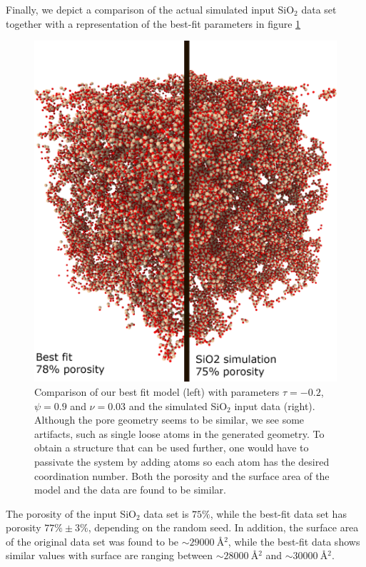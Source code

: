 \documentclass[aps,pre,twocolumn,letterpaper,floatfix,showpacs]{revtex4}
\begin{document}
Finally, we depict a comparison of the actual simulated input SiO$_2$ data set together with a
representation of the best-fit parameters in figure \ref{fig:porous_vs_model}   
\begin{figure}
\includegraphics[width=.45\textwidth]{comparison.png}
\caption{Comparison of our best fit model (left) with parameters $\tau=-0.2$, $\psi=0.9$ and $\nu=0.03$ and the simulated SiO$_2$ input data (right).
Although the pore geometry seems to be similar, we see some artifacts, such as single loose atoms in the generated geometry.
To obtain a structure that can be used further, one would have to passivate the system by adding atoms so each atom has the desired coordination number.
Both the porosity and the surface area of the model and the data are found to be similar.}
\label{fig:porous_vs_model}
\end{figure}

The porosity of the input SiO$_2$ data set is $75\%$, while the best-fit data set has
porosity $77\% \pm 3 \%$, depending on the random seed. In addition, the surface area
of the original data set was found to be $\sim \SI{29000}{\angstrom^2}$, while the best-fit data
shows similar values with surface are ranging between $\sim \SI{28000}{\angstrom^2}$ and $\sim \SI{30000}{\angstrom^2}$.
\end{document}
